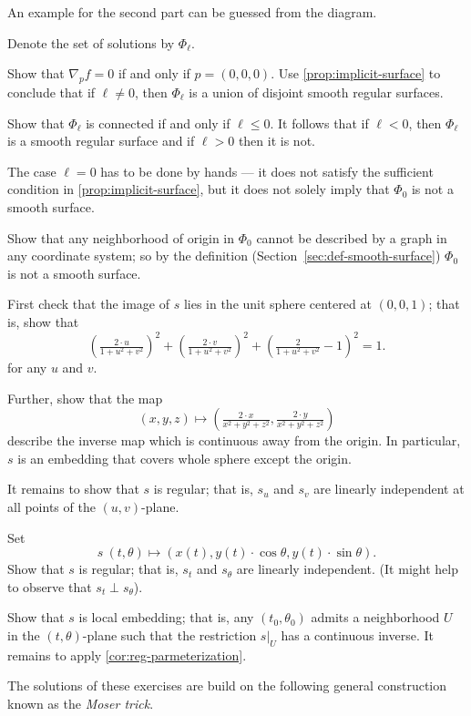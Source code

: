 An example for the second part can be guessed from the diagram.

Denote the set of solutions by $\Phi_\ell$.

Show that $\nabla_p f=0$ if and only if $p=(0,0,0)$.
Use \ref{prop:implicit-surface} to conclude that if $\ell\ne 0$, then $\Phi_\ell$ is a union of disjoint smooth regular surfaces.

Show that $\Phi_\ell$ is connected if and only if $\ell\le 0$.
It follows that if $\ell<0$, then $\Phi_\ell$ is a smooth regular surface and if $\ell>0$ then it is not.

The case $\ell=0$ has to be done by hands --- it does not satisfy the sufficient condition in \ref{prop:implicit-surface}, but it does not solely imply that $\Phi_0$ is not a smooth surface.

Show that any neighborhood of origin in $\Phi_0$ cannot be described by a graph in any coordinate system;
so by the definition (Section~\ref{sec:def-smooth-surface}) $\Phi_0$ is not a smooth surface.

First check that the image of $s$ lies in the unit sphere centered at $(0,0,1)$;
that is, show that 
\[\left(\tfrac{2\cdot u}{1+u^2+v^2}\right)^2
+
\left(\tfrac{2\cdot v}{1+u^2+v^2}\right)^2
+\left(\tfrac{2}{1+u^2+v^2}-1\right)^2=1.\]
for any $u$ and $v$.

Further, show that the map 
\[(x,y,z)\mapsto (\tfrac{2\cdot x}{x^2+y^2+z^2},\tfrac{2\cdot y}{x^2+y^2+z^2})\]
describe the inverse map which is continuous away from the origin.
In particular, $s$ is an embedding that covers whole sphere except the origin.

It remains to show that $s$ is regular; that is, $s_u$ and $s_v$ are linearly independent at all points of the $(u,v)$-plane.

Set
\[s\:(t,\theta)\mapsto (x(t), y(t)\cdot\cos\theta,y(t)\cdot\sin\theta).\]
Show that $s$ is regular; that is, $s_t$ and $s_\theta$ are linearly independent.
(It might help to observe that $s_t\perp s_\theta$).

Show that $s$ is local embedding; that is, any $(t_0,\theta_0)$ admits a neighborhood $U$ in the $(t,\theta)$-plane such that the restriction $s|_U$ has a continuous inverse.
It remains to apply \ref{cor:reg-parmeterization}.

The solutions of these exercises are build on the following general construction known as the \emph{Moser trick}.

